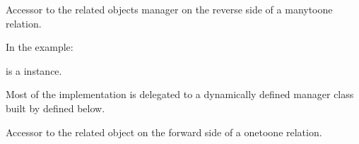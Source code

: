 \documentclass[letterpaper,10pt,french]{sphinxmanual}
\begin{document}
\begin{fulllineitems}
\begin{fulllineitems}
\label{\detokenize{main/model:main.models.DirecteurDesEtudes.delete}}
\pysigstartsignatures
{}
\pysigstopsignatures
\end{fulllineitems}


\begin{fulllineitems}
\label{\detokenize{main/model:main.models.DirecteurDesEtudes.information_set}}
\pysigstartsignatures
{}
\pysigstopsignatures
\sphinxAtStartPar
Accessor to the related objects manager on the reverse side of a
many\sphinxhyphen{}to\sphinxhyphen{}one relation.

\sphinxAtStartPar
In the example:

\begin{sphinxVerbatim}[commandchars=\\\{\}]
 
       
\end{sphinxVerbatim}

\sphinxAtStartPar
{} is a  instance.

\sphinxAtStartPar
Most of the implementation is delegated to a dynamically defined manager
class built by  defined below.

\end{fulllineitems}


\begin{fulllineitems}
\label{\detokenize{main/model:main.models.DirecteurDesEtudes.personnel_ptr}}
\pysigstartsignatures
{}
\pysigstopsignatures
\sphinxAtStartPar
Accessor to the related object on the forward side of a one\sphinxhyphen{}to\sphinxhyphen{}one relation.


\end{fulllineitems}
\end{fulllineitems}
\end{document}
